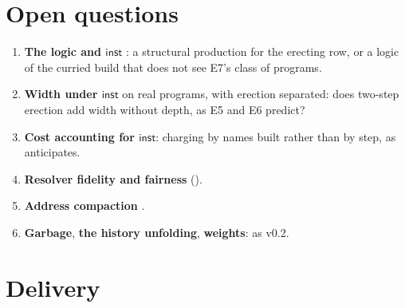 \documentclass[11pt,a4paper]{article}
\theoremstyle{definition}
\theoremstyle{plain}
\newcommand{\inst}{\mathsf{inst}}
\begin{document}
\section{Open questions}

\begin{enumerate}[leftmargin=1.8em]
\item \textbf{The logic and $\inst$} \cite[\S14, item~5]{combspec}: a
structural production for the erecting row, or a logic of the curried build
that does not see E7's class of programs.
\item \textbf{Width under $\inst$} on real programs, with erection separated:
does two-step erection add width without depth, as E5 and E6 predict?
\item \textbf{Cost accounting for $\inst$}: charging by names built rather
than by step, as \cite[Rem.~5.22]{combspec} anticipates.
\item \textbf{Resolver fidelity and fairness} (\cite[Obl.~13.1,
Obl.~13.6]{matnote}).
\item \textbf{Address compaction} \cite[\S15, item~1]{combspec}.
\item \textbf{Garbage}, \textbf{the history unfolding}, \textbf{weights}: as
v0.2.
\end{enumerate}

\section{Delivery}
\end{document}
